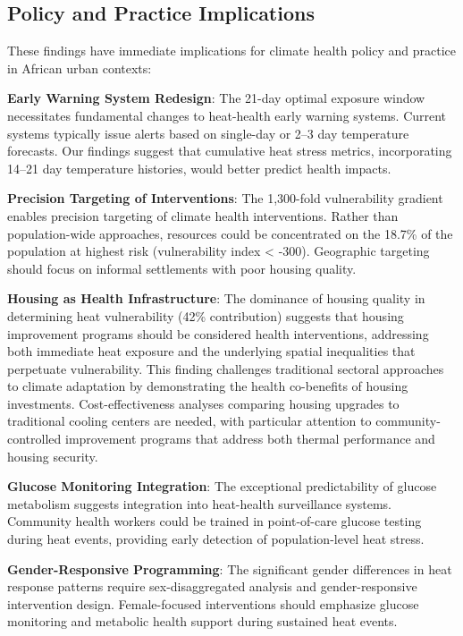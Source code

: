 \documentclass[11pt,a4paper]{article}
\begin{document}
\subsection{Policy and Practice Implications}

These findings have immediate implications for climate health policy and practice in African urban contexts:

\textbf{Early Warning System Redesign}: The 21-day optimal exposure window necessitates fundamental changes to heat-health early warning systems. Current systems typically issue alerts based on single-day or 2--3 day temperature forecasts. Our findings suggest that cumulative heat stress metrics, incorporating 14--21 day temperature histories, would better predict health impacts.

\textbf{Precision Targeting of Interventions}: The 1,300-fold vulnerability gradient enables precision targeting of climate health interventions. Rather than population-wide approaches, resources could be concentrated on the 18.7\% of the population at highest risk (vulnerability index < -300). Geographic targeting should focus on informal settlements with poor housing quality.

\textbf{Housing as Health Infrastructure}: The dominance of housing quality in determining heat vulnerability (42\% contribution) suggests that housing improvement programs should be considered health interventions, addressing both immediate heat exposure and the underlying spatial inequalities that perpetuate vulnerability. This finding challenges traditional sectoral approaches to climate adaptation by demonstrating the health co-benefits of housing investments. Cost-effectiveness analyses comparing housing upgrades to traditional cooling centers are needed, with particular attention to community-controlled improvement programs that address both thermal performance and housing security.

\textbf{Glucose Monitoring Integration}: The exceptional predictability of glucose metabolism suggests integration into heat-health surveillance systems. Community health workers could be trained in point-of-care glucose testing during heat events, providing early detection of population-level heat stress.

\textbf{Gender-Responsive Programming}: The significant gender differences in heat response patterns require sex-disaggregated analysis and gender-responsive intervention design. Female-focused interventions should emphasize glucose monitoring and metabolic health support during sustained heat events.
\end{document}
